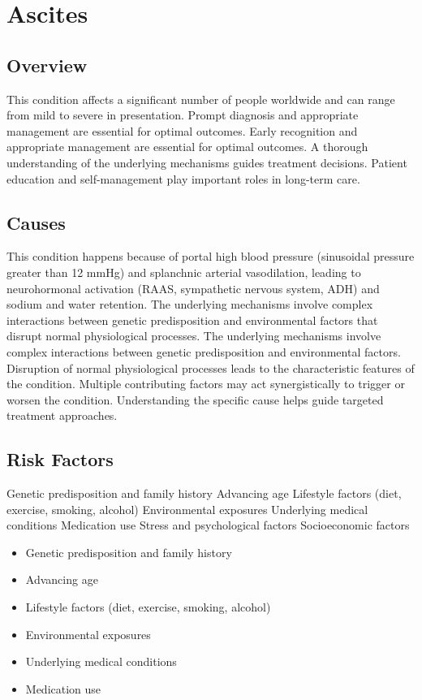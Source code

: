 \chapter{Ascites}
\label{sec:Ascites}

\section{Overview}
This condition affects a significant number of people worldwide and can range from mild to severe in presentation. Prompt diagnosis and appropriate management are essential for optimal outcomes. Early recognition and appropriate management are essential for optimal outcomes. A thorough understanding of the underlying mechanisms guides treatment decisions. Patient education and self-management play important roles in long-term care.
\section{Causes}
This condition happens because of portal high blood pressure (sinusoidal pressure greater than 12 mmHg) and splanchnic arterial vasodilation, leading to neurohormonal activation (RAAS, sympathetic nervous system, ADH) and sodium and water retention. The underlying mechanisms involve complex interactions between genetic predisposition and environmental factors that disrupt normal physiological processes. The underlying mechanisms involve complex interactions between genetic predisposition and environmental factors. Disruption of normal physiological processes leads to the characteristic features of the condition. Multiple contributing factors may act synergistically to trigger or worsen the condition. Understanding the specific cause helps guide targeted treatment approaches.
\section{Risk Factors}
Genetic predisposition and family history Advancing age Lifestyle factors (diet, exercise, smoking, alcohol) Environmental exposures Underlying medical conditions Medication use Stress and psychological factors Socioeconomic factors

\begin{itemize}[noitemsep]
  \item Genetic predisposition and family history
  \item Advancing age
  \item Lifestyle factors (diet, exercise, smoking, alcohol)
  \item Environmental exposures
  \item Underlying medical conditions
  \item Medication use
\end{itemize}
